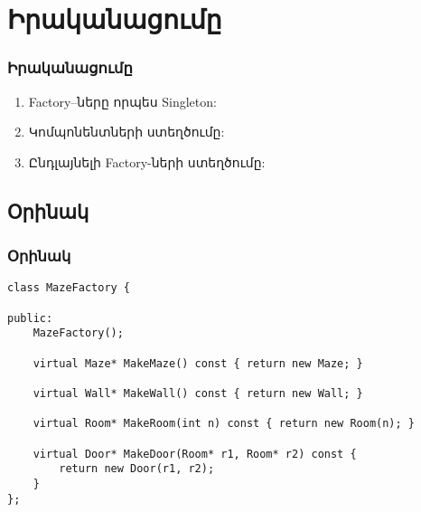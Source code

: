 \documentclass{beamer}
\begin{document}
\section{Իրականացումը}
\begin{frame}\frametitle{Իրականացումը}
\begin{enumerate}
    \item Factory–ները որպես Singleton: \pause \vfill
    \item Կոմպոնենտների ստեղծումը: \pause \vfill
    \item Ընդլայնելի Factory-ների ստեղծումը:
\end{enumerate}
\end{frame}

\subsection{Օրինակ}
\begin{frame}[fragile]\frametitle{Օրինակ}
\begin{english}
\begin{verbatim}
class MazeFactory {

public:
    MazeFactory();

    virtual Maze* MakeMaze() const { return new Maze; }

    virtual Wall* MakeWall() const { return new Wall; }

    virtual Room* MakeRoom(int n) const { return new Room(n); }

    virtual Door* MakeDoor(Room* r1, Room* r2) const {
        return new Door(r1, r2);
    }
};
\end{verbatim}
\end{english}
\end{frame}
\end{document}

